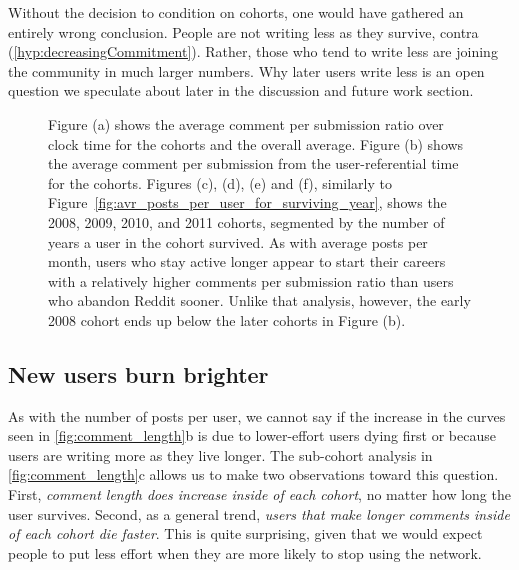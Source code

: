 Without the decision to condition on cohorts, one would have gathered an entirely wrong conclusion. People are not writing less as they survive, contra (\ref{hyp:decreasingCommitment}).  Rather, those who tend to write less are joining the community in much larger numbers.  Why later users write less is an open question we speculate about later in the discussion and future work section.

\begin{figure}[!tb]
\centering
{}
\caption{Figure (a) shows the average comment per submission ratio over clock time for the cohorts and the overall average. Figure (b) shows the average comment per submission from the user-referential time for the cohorts. Figures (c), (d), (e) and (f), similarly to Figure~\ref{fig:avr_posts_per_user_for_surviving_year}, shows the 2008, 2009, 2010, and 2011 cohorts, segmented by the number of years a user in the cohort survived.  As with average posts per month, users who stay active longer appear to start their careers with a relatively higher comments per submission ratio than users who abandon Reddit sooner.  Unlike that analysis, however, the early 2008 cohort ends up below the later cohorts in Figure (b).}
\label{fig:comments_submissions}
\end{figure}

\subsection{New users burn brighter}
As with the number of posts per user, we cannot say if the increase in the curves seen in \ref{fig:comment_length}b is due to lower-effort users dying first or because users are writing more as they live longer.  The sub-cohort analysis in \ref{fig:comment_length}c allows us to make two observations toward this question.  First, \textit{comment length does increase inside of each cohort}, no matter how long the user survives.  Second, as a general trend, \textit{users that make longer comments inside of each cohort die faster}. This is quite surprising, given that we would expect people to put less effort when they are more likely to stop using the network.

